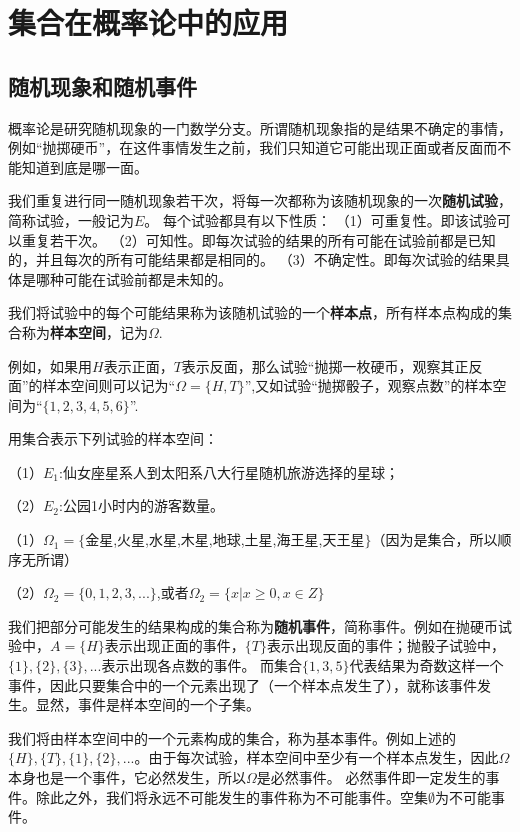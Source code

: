 \section{集合在概率论中的应用}
\subsection{随机现象和随机事件}
概率论是研究随机现象的一门数学分支。所谓随机现象指的是结果不确定的事情，例如“抛掷硬币”，在这件事情发生之前，我们只知道它可能出现正面或者反面而不能知道到底是哪一面。

我们重复进行同一随机现象若干次，将每一次都称为该随机现象的一次\textbf{随机试验}，简称试验，一般记为$E$。
每个试验都具有以下性质：
（1）可重复性。即该试验可以重复若干次。
（2）可知性。即每次试验的结果的所有可能在试验前都是已知的，并且每次的所有可能结果都是相同的。
（3）不确定性。即每次试验的结果具体是哪种可能在试验前都是未知的。

我们将试验中的每个可能结果称为该随机试验的一个\textbf{样本点}，所有样本点构成的集合称为\textbf{样本空间}，记为$\Omega$.

例如，如果用$H$表示正面，$T$表示反面，那么试验“抛掷一枚硬币，观察其正反面”的样本空间则可以记为“$\Omega=\{H,T\}$”,又如试验“抛掷骰子，观察点数”的样本空间为“$\{1,2,3,4,5,6\}$”.

\begin{example}
    用集合表示下列试验的样本空间：
    
    （1）$E_1$:仙女座星系人到太阳系八大行星随机旅游选择的星球；

    （2）$E_2$:公园1小时内的游客数量。
\end{example}
\begin{solution}
    （1）$\Omega_1=\{$金星,火星,水星,木星,地球,土星,海王星,天王星$\}$（因为是集合，所以顺序无所谓）

    （2）$\Omega_2=\{0,1,2,3,...\}$,或者$\Omega_2=\{x|x \geq 0 , x \in Z\}$
\end{solution}

我们把部分可能发生的结果构成的集合称为\textbf{随机事件}，简称事件。例如在抛硬币试验中，$A=\{H\}$表示出现正面的事件，$\{T\}$表示出现反面的事件；抛骰子试验中，$\{1\},\{2\},\{3\},...$表示出现各点数的事件。
而集合$\{1,3,5\}$代表结果为奇数这样一个事件，因此只要集合中的一个元素出现了（一个样本点发生了），就称该事件发生。显然，事件是样本空间的一个子集。

我们将由样本空间中的一个元素构成的集合，称为基本事件。例如上述的$\{H\},\{T\},\{1\},\{2\},...$。由于每次试验，样本空间中至少有一个样本点发生，因此$\Omega$本身也是一个事件，它必然发生，所以$\Omega$是必然事件。
必然事件即一定发生的事件。除此之外，我们将永远不可能发生的事件称为不可能事件。空集$\emptyset$为不可能事件。

